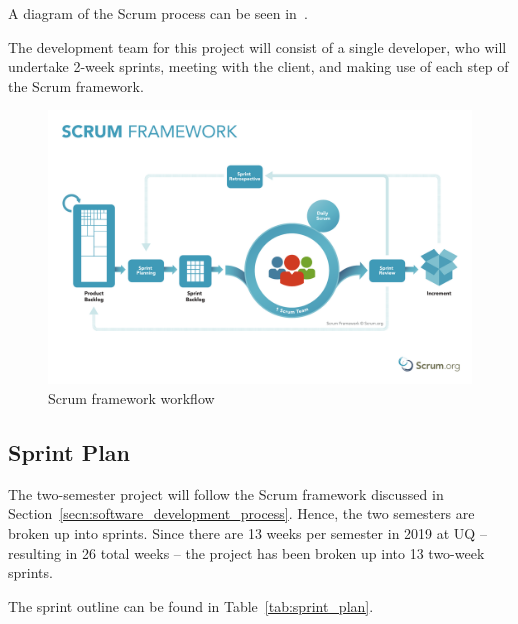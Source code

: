 \documentclass[12pt,openany,a4paper]{book}
\newcommand{\fig}[1]  {Fig.\,\ref{#1}}		%
\newcommand{\tab}[1]  {Table~\ref{#1}}		%
\newcommand{\secn}[1] {Section~\ref{#1}}	%
\begin{document}
A diagram of the Scrum process can be seen in~\cite[\fig{fig:scrum_framework}]{scrum_intro}.

The development team for this project will consist of a single developer, who
will undertake 2-week sprints, meeting with the client, and making use of each
step of the Scrum framework.

\begin{figure}[h]
\centerline{\includegraphics[width=\textwidth]{ScrumFramework.pdf}}
\caption{Scrum framework workflow}
\label{fig:scrum_framework}
\end{figure}

\subsection{Sprint Plan}

The two-semester project will follow the Scrum framework discussed in \secn{secn:software_development_process}.
Hence, the two semesters are broken up into sprints. Since there are 13 weeks per
semester in 2019 at UQ -- resulting in 26 total weeks -- the project has been
broken up into 13 two-week sprints.

The sprint outline can be found in
\tab{tab:sprint_plan}.
\end{document}
